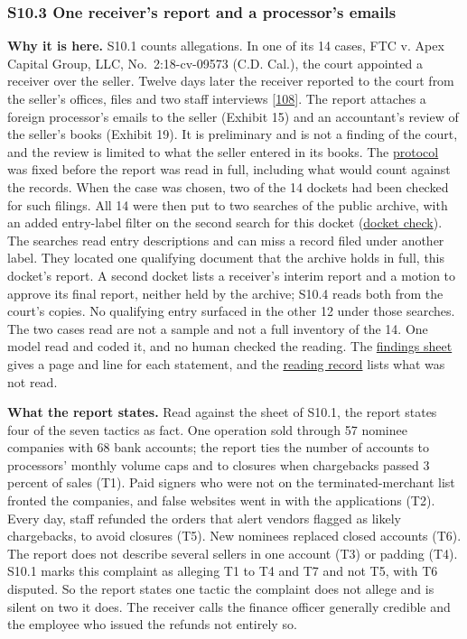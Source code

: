 \documentclass[
  11pt,
]{article}
\begin{document}
\hypertarget{s10.3-one-receivers-report-and-a-processors-emails}{%
\subsubsection{S10.3 One receiver's report and a processor's
emails}\label{s10.3-one-receivers-report-and-a-processors-emails}}

\textbf{Why it is here.} S10.1 counts allegations. In one of its 14
cases, FTC v. Apex Capital Group, LLC, No.~2:18-cv-09573 (C.D. Cal.),
the court appointed a receiver over the seller. Twelve days later the
receiver reported to the court from the seller's offices, files and two
staff interviews
{[}\protect\hyperlink{ref-ApexReceiver2018Report}{108}{]}. The report
attaches a foreign processor's emails to the seller (Exhibit 15) and an
accountant's review of the seller's books (Exhibit 19). It is
preliminary and is not a finding of the court, and the review is limited
to what the seller entered in its books. The
\href{tools/receiver_report/README.md}{protocol} was fixed before the
report was read in full, including what would count against the records.
When the case was chosen, two of the 14 dockets had been checked for
such filings. All 14 were then put to two searches of the public
archive, with an added entry-label filter on the second search for this
docket (\href{tools/receiver_report/DOCKET_CHECK.md}{docket check}). The
searches read entry descriptions and can miss a record filed under
another label. They located one qualifying document that the archive
holds in full, this docket's report. A second docket lists a receiver's
interim report and a motion to approve its final report, neither held by
the archive; S10.4 reads both from the court's copies. No qualifying
entry surfaced in the other 12 under those searches. The two cases read
are not a sample and not a full inventory of the 14. One model read and
coded it, and no human checked the reading. The
\href{tools/receiver_report/FINDINGS.csv}{findings sheet} gives a page
and line for each statement, and the
\href{tools/receiver_report/READING.md}{reading record} lists what was
not read.

\textbf{What the report states.} Read against the sheet of S10.1, the
report states four of the seven tactics as fact. One operation sold
through 57 nominee companies with 68 bank accounts; the report ties the
number of accounts to processors' monthly volume caps and to closures
when chargebacks passed 3 percent of sales (T1). Paid signers who were
not on the terminated-merchant list fronted the companies, and false
websites went in with the applications (T2). Every day, staff refunded
the orders that alert vendors flagged as likely chargebacks, to avoid
closures (T5). New nominees replaced closed accounts (T6). The report
does not describe several sellers in one account (T3) or padding (T4).
S10.1 marks this complaint as alleging T1 to T4 and T7 and not T5, with
T6 disputed. So the report states one tactic the complaint does not
allege and is silent on two it does. The receiver calls the finance
officer generally credible and the employee who issued the refunds not
entirely so.
\end{document}
